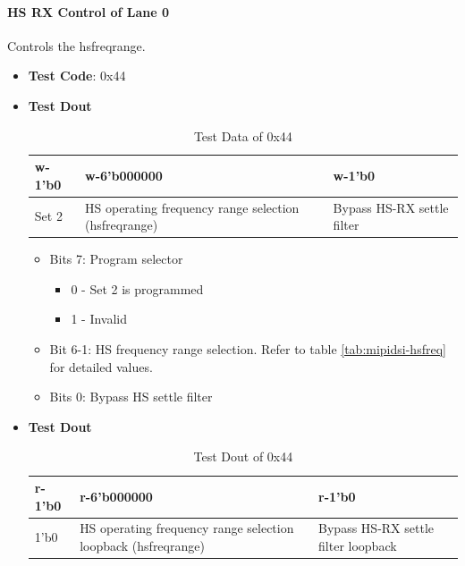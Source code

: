 \documentclass[main\_\_EN.tex]{subfiles}
\begin{document}
\paragraph{HS RX Control of Lane 0}
\label{sec:test-code-0x44}
Controls the hsfreqrange.
\begin{itemize}
    \item \textbf{Test Code}: 0x44
    \item \textbf{Test Dout} 
        \begin{longtable}{ |p{2cm}|p{6cm}|p{6cm}|}
            \caption{Test Data of 0x44}
            \label{tab:test-data-0x44} \\
            \hline
            \rowcolor{lightgray}
            \textbf{w-1'b0} & \textbf{w-6'b000000} & \textbf{w-1'b0} \\ \hline
            Set 2 & HS operating frequency range selection (hsfreqrange) & Bypass HS-RX settle filter \\ \hline
        \end{longtable}

        \begin{itemize}
            \item Bits 7: Program selector
                \begin{itemize}
                    \item 0 - Set 2 is programmed
                    \item 1 - Invalid
                \end{itemize}
            \item Bit 6-1: HS frequency range selection. Refer to table \ref{tab:mipidsi-hsfreq} for detailed values.
            \item Bits 0: Bypass HS settle filter
        \end{itemize}
    \item \textbf{Test Dout}
        \begin{longtable}{ |p{2cm}|p{6cm}|p{6cm}|}
            \caption{Test Dout of 0x44}
            \label{tab:test-dout-0x44} \\
            \hline
            \rowcolor{lightgray}
            \textbf{r-1'b0} & \textbf{r-6'b000000} & \textbf{r-1'b0} \\ \hline
            1'b0 & HS operating frequency range selection loopback (hsfreqrange) & Bypass HS-RX settle filter loopback \\ \hline
        \end{longtable}
\end{itemize}
\end{document}
